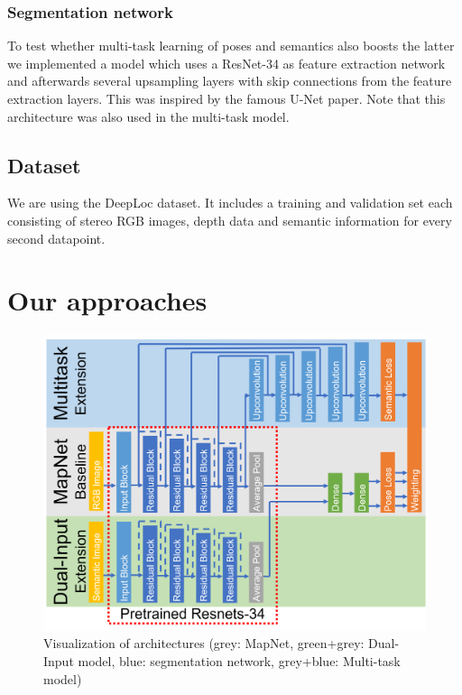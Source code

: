 \documentclass[10pt,twocolumn,letterpaper]{article}
\begin{document}
\subsubsection{Segmentation network}\label{sec:segnet}
To test whether multi-task learning of poses and semantics also boosts the latter we implemented a model which uses a ResNet-34 as feature extraction network and afterwards several upsampling layers with skip connections from the feature extraction layers. This was inspired by the famous U-Net paper\cite{ronneberger2015u}. Note that this architecture was also used in the multi-task model. 
\subsection{Dataset}\label{sec:data}
We are using the DeepLoc dataset\cite{radwan18ral}. It includes a training and validation set each consisting of stereo RGB images, depth data and semantic information for every second datapoint. 

\section{Our approaches}
\begin{figure}[t]
	\begin{center}
		\includegraphics[width=0.8\linewidth]{images/architektur.png}
	\end{center}
	\caption{Visualization of architectures (grey: MapNet, green+grey: Dual-Input model, blue: segmentation network, grey+blue: Multi-task model)}
	\label{fig:arch}
\end{figure}
\end{document}
